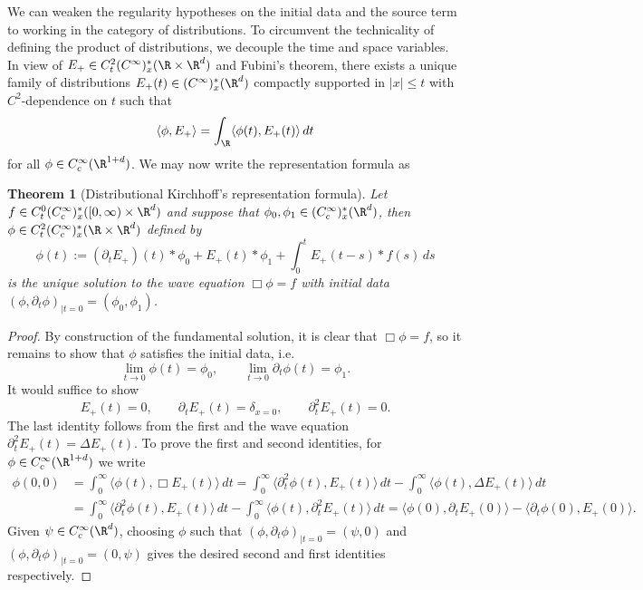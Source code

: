 \documentclass[reqno]{amsart}
\newtheorem{theorem}{Theorem}
\theoremstyle{definition}
\theoremstyle{remark}
\begin{document}
We can weaken the regularity hypotheses on the initial data and the source term to working in the category of distributions. To circumvent the technicality of defining the product of distributions, we decouple the time and space variables. In view of $E_+ \in C^2_t  (C^\infty)^*_x (\R \times \R^d)$ and Fubini's theorem, there exists a unique family of distributions $E_+ (t) \in (C^\infty)^*_x (\R^d)$ compactly supported in $|x| \leq t$ with $C^2$-dependence on $t$ such that
	\[ \langle \phi, E_+ \rangle = \int_\R  \langle \phi (t) , E_+ (t) \rangle \, dt \] 
for all $\phi \in  C^\infty_c (\R^{1 + d})$. We may now write the representation formula as

\begin{theorem}[Distributional Kirchhoff's representation formula]
	Let $f \in C^0_t (C^\infty_c)^*_x ([0, \infty) \times \R^{d})$ and suppose that $\phi_0, \phi_1 \in (C^\infty_c)^*_x (\R^d)$, then $\phi \in C^2_t (C^\infty_c)^*_x (\R \times \R^d)$ defined by 
		\[ \phi (t) := (\partial_t E_+)(t) * \phi_0 + E_+ (t) * \phi_1 + \int_0^t E_+ (t - s) * f(s) \, ds \]
	is the unique solution to the wave equation $\Box \phi = f$ with initial data $(\phi, \partial_t \phi)_{|t = 0} = (\phi_0, \phi_1)$.
\end{theorem}

\begin{proof}
	By construction of the fundamental solution, it is clear that $\Box \phi = f$, so it remains to show that $\phi$ satisfies the initial data, i.e.
		\[ \lim_{t \to 0} \phi (t) = \phi_0, \qquad \lim_{t \to 0} \partial_t \phi(t) = \phi_1. \]
	It would suffice to show
		\[ E_+ (t) = 0, \qquad \partial_t E_+ (t) = \delta_{x = 0}, \qquad \partial_t^2 E_+ (t) = 0.\]	
	The last identity follows from the first and the wave equation $\partial_t^2 E_+ (t) = \Delta E_+ (t)$. To prove the first and second identities, for $\phi \in C^\infty_c (\R^{1 + d})$ we write
		\begin{align*}
			\phi(0, 0)
				&= \int_0^\infty \langle \phi(t),  \Box E_+ (t) \rangle \, dt = \int_0^\infty \langle \partial_t^2 \phi(t), E_+ (t) \rangle \, dt - \int_0^\infty \langle \phi(t), \Delta E_+ (t) \rangle \, dt \\
				&= \int_0^\infty \langle \partial_t^2 \phi(t), E_+ (t) \rangle \, dt - \int_0^\infty \langle \phi(t), \partial_t^2 E_+ (t) \rangle \, dt = \langle \phi(0), \partial_t E_+ (0) \rangle - \langle \partial_t \phi(0), E_+ (0) \rangle. 
		\end{align*}	
	Given $\psi \in C^\infty_c (\R^d)$, choosing $\phi$ such that $(\phi, \partial_t \phi)_{|t = 0}	 = (\psi, 0)$ and $(\phi, \partial_t \phi)_{|t = 0} = (0, \psi)$ gives the desired second and first identities respectively. 
\end{proof}	
\end{document}
